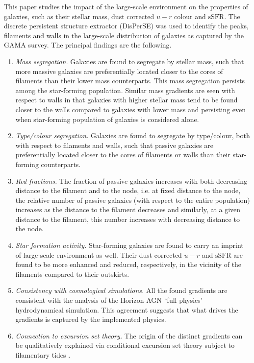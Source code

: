 \documentclass[useAMS,usenatbib]{mnras}
\newcommand{\ssfr}{$\mbox{sSFR}$\xspace}
\newcommand{\hagn}{\mbox{{\sc \small Horizon-AGN}}}
\begin{document}
This paper studies the impact of the large-scale environment  on the properties of galaxies, such as their stellar mass, dust corrected $u - r$ colour and \ssfr. The discrete persistent structure extractor (DisPerSE) was used to identify the peaks, filaments and walls in the large-scale distribution of galaxies as captured by the GAMA survey. 
%
The principal findings are the following.
\begin{enumerate}
\item \textit{Mass segregation.} Galaxies are found to segregate by stellar mass, such that more massive galaxies are preferentially located closer to the cores of filaments than their lower mass counterparts. This mass segregation persists among the star-forming population.   
Similar mass gradients are seen with respect to walls in that galaxies with higher stellar mass tend to be found closer to the walls compared to galaxies with lower mass and persisting even when star-forming population of galaxies is considered alone.
\item \textit{Type/colour segregation.} Galaxies are found to segregate by type/colour, both with respect to filaments and walls, such that passive galaxies are preferentially located closer to the cores of filaments or walls than their star-forming counterparts. 
\item \textit{Red fractions.} The fraction of passive galaxies increases with both decreasing distance to the filament and to the node, i.e. at fixed distance to the node, the relative number of passive galaxies (with respect to the entire population) increases as the distance to the filament decreases and similarly, at a given distance to the filament, this number increases with decreasing distance to the node.    
\item \textit{Star formation activity.} Star-forming galaxies are found to carry an imprint of large-scale environment as well. Their dust corrected $u - r$ and \ssfr are found to be more enhanced and reduced, respectively, in the vicinity of the filaments compared to their outskirts.   
\item \textit{Consistency with cosmological  simulations.} All the found gradients are consistent with the analysis of the \hagn\, `full physics' hydrodynamical simulation. This  agreement suggests that what drives the gradients is captured by the implemented physics.  
\item \textit{Connection to excursion set theory.}  The origin of the distinct gradients can be qualitatively explained via conditional excursion set theory subject to filamentary tides \citep{biaspaper}. %
\end{enumerate}
\end{document}
